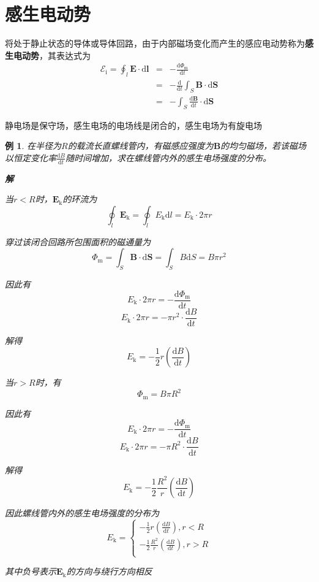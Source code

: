 \documentclass[12pt, a4paper, twoside]{ctexbook}
\newtheorem{example}[theorem]{例}
\begin{document}
\section{感生电动势}
将处于静止状态的导体或导体回路，由于内部磁场变化而产生的感应电动势称为\textbf{感生电动势}，其表达式为
\begin{eqnarray}
    \mathscr{E}_\mathrm{i}=\oint_l \boldsymbol{E}\cdot\mathrm{d}\boldsymbol{l}&=&-\frac{\mathrm{d}\varPhi_\mathrm{m}}{\mathrm{d}t} \nonumber \\
    ~&=&-\frac{\mathrm{d}}{\mathrm{d}t}\int_S\boldsymbol{B}\cdot\mathrm{d}\boldsymbol{S} \nonumber \\
    ~&=&-\int_S\frac{\mathrm{d}\boldsymbol{B}}{\mathrm{d}t}\cdot\mathrm{d}\boldsymbol{S} \nonumber
\end{eqnarray}

静电场是保守场，感生电场的电场线是闭合的，感生电场为有旋电场
\begin{example}
    在半径为$R$的载流长直螺线管内，有磁感应强度为$\boldsymbol{B}$的均匀磁场，若该磁场以恒定变化率$\frac{\mathrm{d}B}{\mathrm{d}t}$随时间增加，求在螺线管内外的感生电场强度的分布。

    \noindent\textbf{解}

    当$r<R$时，$\boldsymbol{E}_\mathrm{k}$的环流为
    $$
    \oint_l \boldsymbol{E}_\mathrm{k}=\oint_l E_\mathrm{k}\mathrm{d}l=E_\mathrm{k}\cdot2\pi r
    $$

    穿过该闭合回路所包围面积的磁通量为
    $$
    \varPhi_\mathrm{m}=\int_S \boldsymbol{B}\cdot\mathrm{d}\boldsymbol{S}=\int_S B\mathrm{d}S=B\pi r^2
    $$

    因此有
    $$
    E_\mathrm{k}\cdot2\pi r=-\frac{\mathrm{d}\varPhi_\mathrm{m}}{\mathrm{d}t}
    $$
    $$
    E_\mathrm{k}\cdot2\pi r=-\pi r^2\cdot\frac{\mathrm{d}B}{\mathrm{d}t}
    $$
    
    解得
    $$
    E_\mathrm{k}=-\frac{1}{2}r\left(\frac{\mathrm{d}B}{\mathrm{d}t}\right)
    $$

    当$r>R$时，有
    $$
    \varPhi_\mathrm{m}=B\pi R^2
    $$

    因此有
    $$
    E_\mathrm{k}\cdot2\pi r=-\frac{\mathrm{d}\varPhi_\mathrm{m}}{\mathrm{d}t}
    $$
    $$
    E_\mathrm{k}\cdot2\pi r=-\pi R^2\cdot\frac{\mathrm{d}B}{\mathrm{d}t}
    $$

    解得
    $$
    E_\mathrm{k}=-\frac{1}{2}\frac{R^2}{r}\left(\frac{\mathrm{d}B}{\mathrm{d}t}\right)
    $$

    因此螺线管内外的感生电场强度的分布为
    $$
    E_{\mathrm{k}}=\left\{ \begin{array}{l}
        -\frac{1}{2}r\left( \frac{\mathrm{d}B}{\mathrm{d}t} \right) ,r<R\\
        -\frac{1}{2}\frac{R^2}{r}\left( \frac{\mathrm{d}B}{\mathrm{d}t} \right) ,r>R\\
    \end{array} \right. 
    $$

    其中负号表示$\boldsymbol{E}_\mathrm{k}$的方向与绕行方向相反
\end{example}
\end{document}
